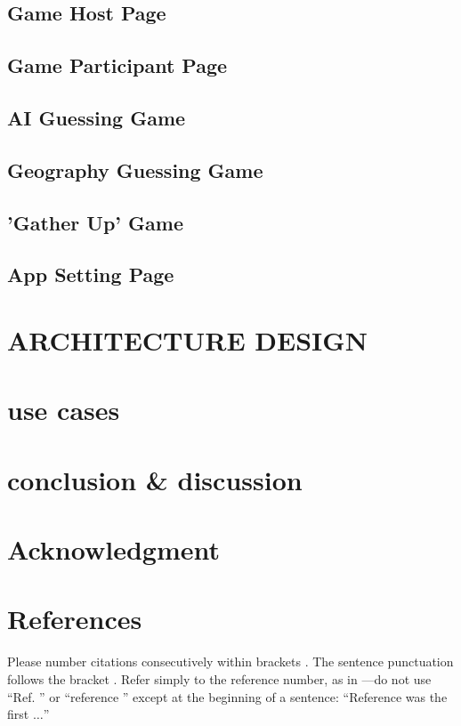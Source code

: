 \documentclass[conference]{IEEEtran}
\begin{document}
    \subsection{Game Host Page}
    \subsection{Game Participant Page}
    \subsection{AI Guessing Game}
    \subsection{Geography Guessing Game}
    \subsection{'Gather Up' Game}
    \subsection{App Setting Page}

\section{ARCHITECTURE DESIGN}

\section{use cases}

\section{conclusion \& discussion}

\section*{Acknowledgment}

\section*{References}

Please number citations consecutively within brackets \cite{b1}. The 
sentence punctuation follows the bracket \cite{b2}. Refer simply to the reference 
number, as in \cite{b3}---do not use ``Ref. \cite{b3}'' or ``reference \cite{b3}'' except at 
the beginning of a sentence: ``Reference \cite{b3} was the first $\ldots$''
\end{document}
